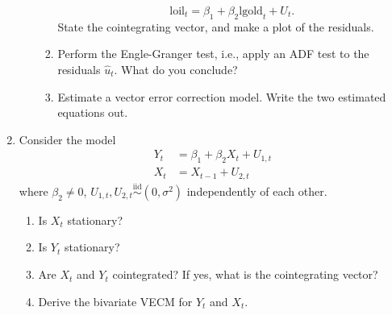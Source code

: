 \documentclass[11pt, a4paper]{article}
\begin{document}
\begin{enumerate}
\begin{enumerate}
\begin{enumerate}
	\[
	\mbox{loil}_t=\beta_1+\beta_2\mbox{lgold}_t+U_t.
	\]
	State the cointegrating vector, and make a plot of the residuals.
	\item Perform the Engle-Granger test, i.e., apply an ADF test to the residuals $\hat{u}_t$. What do you conclude?
	\item Estimate a vector error correction model. Write the two estimated equations out.
\end{enumerate}
\end{enumerate}
\item
Consider the model
\begin{align*}
Y_t&=\beta_1 +\beta_2 X_t+U_{1,t}\\
X_t&=X_{t-1}+U_{2,t}
\end{align*}
where $\beta_2\neq0$, $U_{1,t},U_{2,t}\stackrel{\mathrm{iid}}{\sim}(0,\sigma^2)$ independently of each other.
\begin{enumerate}
\item Is $X_t$ stationary?
\item Is $Y_t$ stationary?
\item Are $X_t$ and $Y_t$ cointegrated? If yes, what is the cointegrating vector?
\item Derive the bivariate VECM for $Y_t$ and $X_t$.
\end{enumerate}





\end{enumerate}
\end{document}
